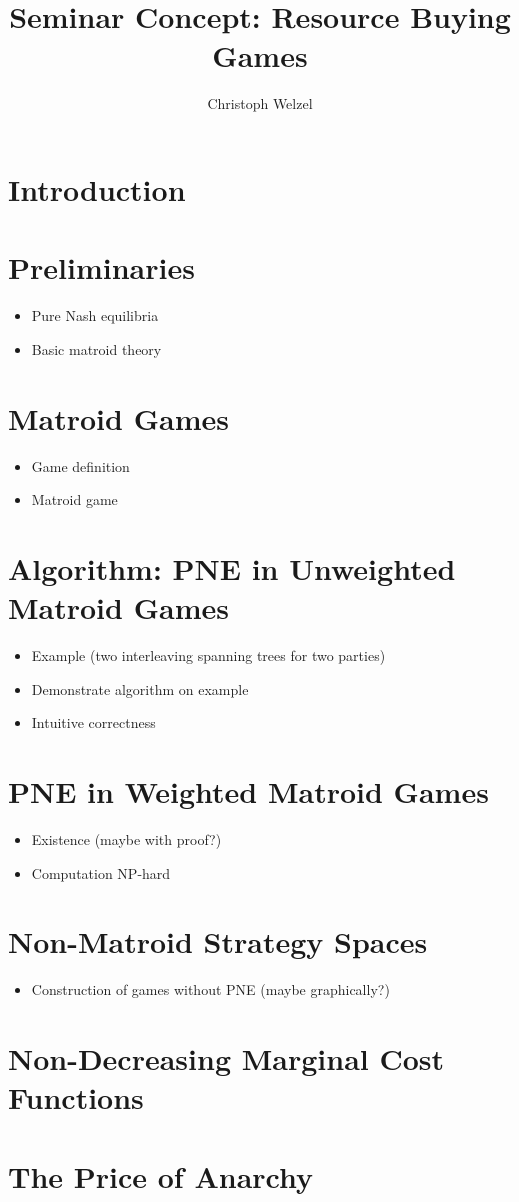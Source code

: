 \documentclass{tufte-handout}
\title{Seminar Concept: Resource Buying Games}
\author[C. Welzel]{Christoph Welzel}
\begin{document}
\maketitle
\section{Introduction}

\section{Preliminaries}
\begin{itemize}
  \item Pure Nash equilibria
  \item Basic matroid theory
\end{itemize}

\section{Matroid Games}
\begin{itemize}
  \item Game definition
  \item Matroid game
\end{itemize}

\section{Algorithm: PNE in Unweighted Matroid Games}
\begin{itemize}
  \item Example (two interleaving spanning trees for two parties)
  \item Demonstrate algorithm on example
  \item Intuitive correctness
\end{itemize}

\section{PNE in Weighted Matroid Games}
\begin{itemize}
  \item Existence (maybe with proof?)
  \item Computation NP-hard
\end{itemize}

\section{Non-Matroid Strategy Spaces}
\begin{itemize}
  \item Construction of games without PNE (maybe graphically?)
\end{itemize}

\section{Non-Decreasing Marginal Cost Functions}

\section{The Price of Anarchy}
\end{document}

